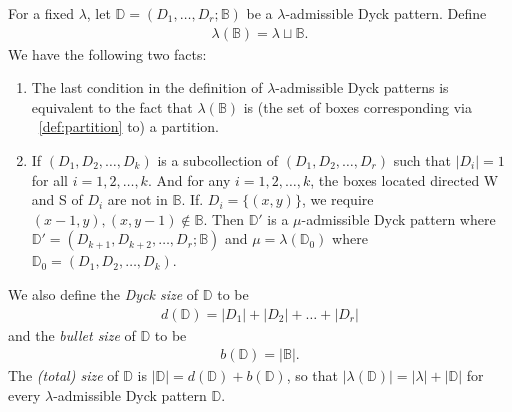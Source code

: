 \documentclass[12pt]{amsart}
\theoremstyle{definition}
\theoremstyle{remark}
\newcommand{\bbB}{\mathbb{B}}
\newcommand{\bbD}{\mathbb{D}}
\numberwithin{equation}{section}
\begin{document}
\begin{minipage}{.33\textwidth}
\centering
{}%
\end{minipage}

For a fixed $\lambda$, let $\bbD = (D_1,\ldots,D_r ; \bbB)$ be a $\lambda$-admissible Dyck pattern. Define
\begin{align} \label{def:lambdaB}
    \lambda(\bbB) = \lambda \sqcup \bbB.
\end{align}
We have the following two facts:
\begin{enumerate}
    \item The last condition in the definition of $\lambda$-admissible Dyck patterns is equivalent to the fact that $\lambda(\bbB)$ is (the set of boxes corresponding via ~\ref{def:partition} to) a partition.
    \item If $(D_1,D_2,\ldots,D_k)$ is a subcollection of $(D_1,D_2,\ldots,D_r)$ such that $|D_i| = 1$ for all $i = 1,2,\ldots,k$. And for any $i=1,2,\ldots,k$, the boxes located directed W and S of $D_i$ are not in $\bbB$. If. $D_i = \{(x,y)\}$, we require $(x-1,y),(x,y-1) \notin \bbB$. Then $\bbD'$ is a $\mu$-admissible Dyck pattern where $\bbD' = (D_{k+1},D_{k+2},\ldots,D_{r};\bbB)$ and $\mu = \lambda(\bbD_0)$ where $\bbD_0 = (D_1,D_2,\ldots,D_k)$.
\end{enumerate}

We also define the \emph{Dyck size} of $\bbD$ to be
\begin{align} \label{def:Dycksize}
    d(\bbD) = |D_1| + |D_2| + \ldots + |D_r|
\end{align}
and the \emph{bullet size} of $\bbD$ to be
\begin{align} \label{def:Bulletsize}
    b(\bbD) = |\bbB|.
\end{align}
The \emph{(total) size} of $\bbD$ is $|\bbD| = d(\bbD) + b(\bbD)$, so that $|\lambda(\bbD)| = |\lambda| + |\bbD|$ for every $\lambda$-admissible Dyck pattern $\bbD$.
\end{document}
